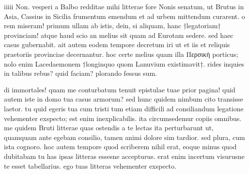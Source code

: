 


 iiiii Non. vesperi a Balbo redditae mihi litterae fore Nonis senatum, ut Brutus in Asia, Cassius in Sicilia frumentum emendum et ad urbem mittendum curarent. o rem miseram! primum ullam ab istis, dein, si aliquam, hanc †legatoriam† provinciam! atque haud scio an melius sit quam ad Eurotam sedere. sed haec casus gubernabit. ait autem eodem tempore decretum iri ut et iis et reliquis praetoriis provinciae decernantur. hoc certe melius quam illa Περσικὴ porticus; nolo enim Lacedaemonem †longinquo quom Lanuvium existimavit†. rides inquies in talibus rebus? quid faciam? plorando fessus sum.

 di immortales! quam me conturbatum tenuit epistulae tuae prior pagina! quid autem iste in domo tua casus armorum? sed hunc quidem nimbum cito transisse laetor. tu quid egeris tua cum tristi tum etiam difficili ad consiliandum legatione vehementer exspecto; est enim inexplicabilis. ita circumsedemur copiis omnibus. me quidem Bruti litterae quas ostendis a te lectas ita perturbarunt ut, quamquam ante egebam consilio, tamen animi dolore sim tardior. sed plura, cum ista cognoro. hoc autem tempore quod scriberem nihil erat, eoque minus quod dubitabam tu has ipsas litteras essesne accepturus. erat enim incertum visurusne te esset tabellarius. ego tuas litteras vehementer exspecto.
